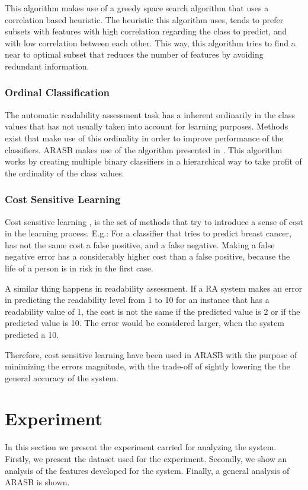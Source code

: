 \documentclass{acm_proc_article-sp}
\begin{document}
This algorithm makes use of a greedy space search algorithm that uses a correlation based heuristic. The heuristic this algorithm uses, tends to prefer subsets with features with high correlation regarding the class to predict, and with low correlation between each other. This way, this algorithm tries to find a near to optimal subset that reduces the number of features by avoiding redundant information.


\subsubsection{Ordinal Classification}
The automatic readability assessment task has a inherent ordinarily in the class values that has not usually taken into account for learning purposes. Methods exist that make use of this ordinality in order to improve performance of the classifiers. ARASB makes use of the algorithm presented in \cite{frank2001simple}. This algorithm works by creating multiple binary classifiers in a hierarchical way to take profit of the ordinality of the class values.


\subsubsection{Cost Sensitive Learning}
Cost sensitive learning \cite{ling2010cost}, is the set of methods that try to introduce a sense of cost in the learning process. E.g.: For a classifier that tries to predict breast cancer, has not the same cost a false positive, and a false negative.  Making a false negative error has a considerably higher cost than a false positive, because the life of a person is in risk in the first case. 

A similar thing happens in readability assessment. If a RA system makes an error in predicting the readability level from 1 to 10 for an instance that has a readability value of 1, the cost is not the same if the predicted value is 2 or if the predicted value is 10. The error would be considered larger, when the system predicted a 10.

Therefore, cost sensitive learning have been used in ARASB with the purpose of minimizing the errors magnitude, with the trade-off of sightly lowering the the general accuracy of the system.

\section{Experiment}
In this section we present the experiment carried for analyzing the system. Firstly, we present the dataset used for the experiment. Secondly, we show an analysis of the features developed for the system. Finally, a general analysis of ARASB is shown.
\end{document}
